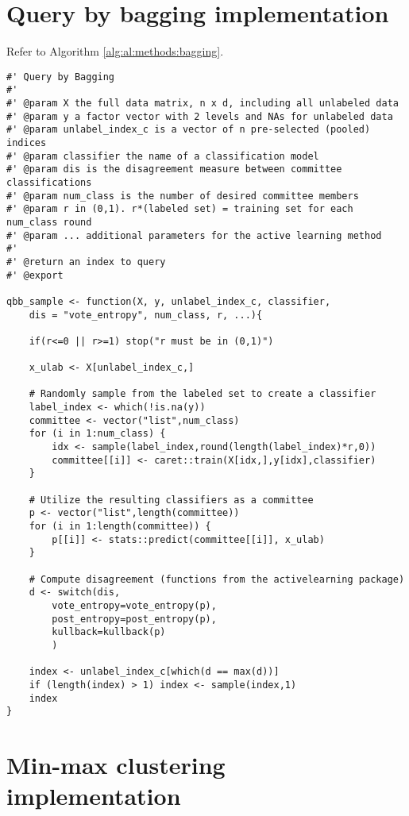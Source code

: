 \section{Query by bagging implementation}
\label{sec:appendicies:al:bagging}

Refer to Algorithm \ref{alg:al:methods:bagging}. 
{
\begin{lstlisting}
#' Query by Bagging
#'
#' @param X the full data matrix, n x d, including all unlabeled data
#' @param y a factor vector with 2 levels and NAs for unlabeled data
#' @param unlabel_index_c is a vector of n pre-selected (pooled) indices
#' @param classifier the name of a classification model
#' @param dis is the disagreement measure between committee classifications
#' @param num_class is the number of desired committee members
#' @param r in (0,1). r*(labeled set) = training set for each num_class round
#' @param ... additional parameters for the active learning method
#'
#' @return an index to query
#' @export

qbb_sample <- function(X, y, unlabel_index_c, classifier, 
	dis = "vote_entropy", num_class, r, ...){

	if(r<=0 || r>=1) stop("r must be in (0,1)")
	
	x_ulab <- X[unlabel_index_c,]
	
	# Randomly sample from the labeled set to create a classifier
	label_index <- which(!is.na(y))
	committee <- vector("list",num_class)
	for (i in 1:num_class) {
		idx <- sample(label_index,round(length(label_index)*r,0))
		committee[[i]] <- caret::train(X[idx,],y[idx],classifier)
	}
	
	# Utilize the resulting classifiers as a committee
	p <- vector("list",length(committee))
	for (i in 1:length(committee)) {
		p[[i]] <- stats::predict(committee[[i]], x_ulab)
	}
	
	# Compute disagreement (functions from the activelearning package)
	d <- switch(dis,
		vote_entropy=vote_entropy(p),
		post_entropy=post_entropy(p),
		kullback=kullback(p)
		)
	
	index <- unlabel_index_c[which(d == max(d))]
	if (length(index) > 1) index <- sample(index,1)
	index
}
\end{lstlisting}
}

\section{Min-max clustering implementation}
\label{sec:appendicies:al:clustering}

